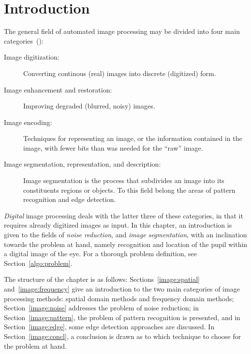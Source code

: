
\section{Introduction}
\label{image:intro}

The general field of automated image processing may be divided into
four main categories~(\cite{digim}):

\begin{description}
\item[Image digitization:] Converting continous (real) images into
  discrete (digitized) form.
\item[Image enhancement and restoration:] Improving degraded (blurred,
  noisy) images.
\item[Image encoding:] Techniques for representing an image, or the
  information contained in the image, with fewer bits than was needed
  for the ``raw'' image.
\item[Image segmentation, representation, and description:] Image
  segmentation is the process that subdivides an image into its
  constituents regions or objects.  To this field belong the areas of
  pattern recognition and edge detection.
\end{description}

{\em Digital\/} image processing deals with the latter three of these
categories, in that it requires already digitized images as input.  In
this chapter, an introduction is given to the fields of {\em noise
  reduction\/}, and {\em image segmentation\/}, with an inclination
towards the problem at hand, namely recognition and location of the
pupil within a digital image of the eye.  For a thorough problem
definition, see Section~\ref{algo:problem}.

The structure of the chapter is as follows:
Sections~\ref{image:spatial} and~\ref{image:frequency} give an
introduction to the two main categories of image processing methods:
spatial domain methods and frequency domain methods;
Section~\ref{image:noise} addresses the problem of noise reduction; in
Section~\ref{image:pattern}, the problem of pattern recognition is
presented, and in Section~\ref{image:edge}, some edge detection
approaches are discussed.  In Section~\ref{image:concl}, a conclusion
is drawn as to which technique to choose for the problem at hand.
